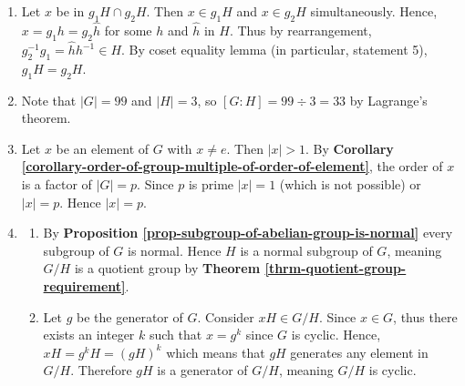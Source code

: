\begin{enumerate}
    \item Let $x$ be in $g_1H \cap g_2H$. Then $x \in g_1H$ and $x \in g_2H$ simultaneously. Hence, $x = g_1h = g_2\hat{h}$ for some $h$ and $\hat{h}$ in $H$. Thus by rearrangement, $g_2^{-1}g_1 = \hat{h}h^{-1} \in H$. By coset equality lemma (in particular, statement 5), $g_1H = g_2H$.

    \item Note that $|G| = 99$ and $|H| = 3$, so $[G:H] = 99 \div 3 = 33$ by Lagrange's theorem.

    \item Let $x$ be an element of $G$ with $x \neq e$. Then $|x| > 1$. By \textbf{Corollary \ref{corollary-order-of-group-multiple-of-order-of-element}}, the order of $x$ is a factor of $|G| = p$. Since $p$ is prime $|x| = 1$ (which is not possible) or $|x| = p$. Hence $|x| = p$.
    
    \item \begin{enumerate}[label=(\roman*)]
        \item By \textbf{Proposition \ref{prop-subgroup-of-abelian-group-is-normal}} every subgroup of $G$ is normal. Hence $H$ is a normal subgroup of $G$, meaning $G/H$ is a quotient group by \textbf{Theorem \ref{thrm-quotient-group-requirement}}.
        \item Let $g$ be the generator of $G$. Consider $xH \in G/H$. Since $x \in G$, thus there exists an integer $k$ such that $x = g^k$ since $G$ is cyclic. Hence, $xH = g^kH = (gH)^k$ which means that $gH$ generates any element in $G/H$. Therefore $gH$ is a generator of $G/H$, meaning $G/H$ is cyclic.
    \end{enumerate}
\end{enumerate}

